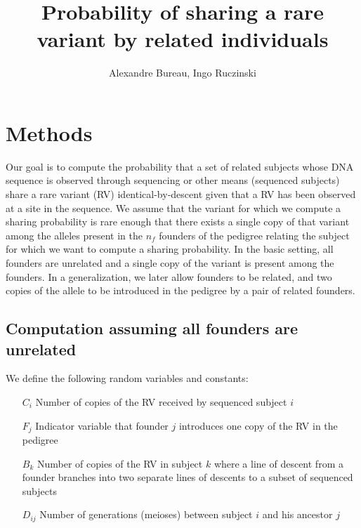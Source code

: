 \documentclass[12pt]{aastex}
\begin{document}
\title{Probability of sharing a rare variant by related individuals}

\author{Alexandre Bureau, Ingo Ruczinski}

\section{Methods}

Our goal is to compute the probability that a set of related subjects whose DNA sequence is observed through sequencing or other means (sequenced subjects) share a rare variant (RV) identical-by-descent given that a RV has been observed at a site in the sequence. We assume that the variant for which we compute a sharing probability is rare enough that there exists a single copy of that variant among the alleles present in the $n_f$ founders of the pedigree relating the subject for which we want to compute a sharing probability. In the basic setting, all founders are unrelated and a single copy of the variant is present among the founders. In a generalization, we later allow founders to be related, and two copies of the allele to be introduced in the pedigree by a pair of related founders.

\subsection{Computation assuming all founders are unrelated}

We define the following random variables and constants:

\begin{itemize}
\item[$C_i$] Number of copies of the RV received by sequenced subject $i$
\item[$F_j$] Indicator variable that founder $j$ introduces one copy of the RV in the pedigree
\item[$B_k$] Number of copies of the RV in subject $k$ where a line of descent from a founder branches into two separate lines of descents to a subset of sequenced subjects
\item[$D_{ij}$] Number of generations (meioses) between subject $i$ and his ancestor $j$
\end{itemize}
\end{document}
